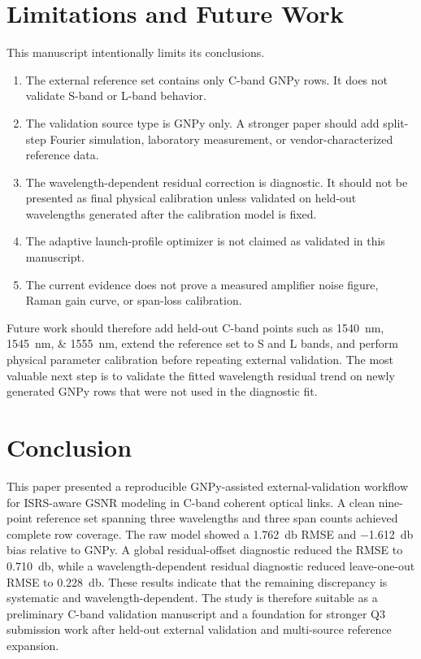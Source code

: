 \documentclass[journal]{IEEEtran}
\begin{document}
\section{Limitations and Future Work}
This manuscript intentionally limits its conclusions.
\begin{enumerate}
    \item The external reference set contains only C-band GNPy rows. It does not validate S-band or L-band behavior.
    \item The validation source type is GNPy only. A stronger paper should add split-step Fourier simulation, laboratory measurement, or vendor-characterized reference data.
    \item The wavelength-dependent residual correction is diagnostic. It should not be presented as final physical calibration unless validated on held-out wavelengths generated after the calibration model is fixed.
    \item The adaptive launch-profile optimizer is not claimed as validated in this manuscript.
    \item The current evidence does not prove a measured amplifier noise figure, Raman gain curve, or span-loss calibration.
\end{enumerate}
Future work should therefore add held-out C-band points such as \SIlist{1540;1545;1555}{\nano\meter}, extend the reference set to S and L bands, and perform physical parameter calibration before repeating external validation. The most valuable next step is to validate the fitted wavelength residual trend on newly generated GNPy rows that were not used in the diagnostic fit.

\section{Conclusion}
This paper presented a reproducible GNPy-assisted external-validation workflow for ISRS-aware GSNR modeling in C-band coherent optical links. A clean nine-point reference set spanning three wavelengths and three span counts achieved complete row coverage. The raw model showed a \SI{1.762}{\decibel} RMSE and \SI{-1.612}{\decibel} bias relative to GNPy. A global residual-offset diagnostic reduced the RMSE to \SI{0.710}{\decibel}, while a wavelength-dependent residual diagnostic reduced leave-one-out RMSE to \SI{0.228}{\decibel}. These results indicate that the remaining discrepancy is systematic and wavelength-dependent. The study is therefore suitable as a preliminary C-band validation manuscript and a foundation for stronger Q3 submission work after held-out external validation and multi-source reference expansion.
\end{document}
